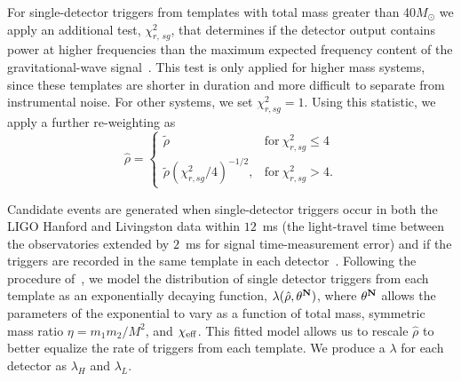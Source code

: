 For single-detector triggers from templates with total mass greater than 40$M_{\odot}$ we apply an additional test, $\chi^2_{r, \,sg}$, that determines if the detector output contains power at higher frequencies than the maximum expected frequency content of the gravitational-wave signal~\citep{Nitz:2017lco}. This test is only applied for higher mass systems, since these templates are shorter in duration and more difficult to separate from instrumental noise. For other systems, we set $\chi^2_{r,sg} = 1$. Using this statistic, we apply a further re-weighting as
%
\begin{equation}
\label{eq:sg}
 \hat{\rho} = \begin{cases} 
        \tilde{\rho} & \mathrm{for}\ \chi^2_{r,sg} \leq 4 \\
        \tilde{\rho} (\chi^2_{r,sg} / 4)^{-1/2}, & 
        \mathrm{for}\ \chi^2_{r,sg} > 4.
    \end{cases}
\end{equation}

Candidate events are generated when single-detector triggers occur in both the LIGO Hanford and Livingston data within $12$~ms (the light-travel time between the observatories extended by $2$~ms for signal time-measurement error) and if the triggers are recorded in the same template in each detector~\citep{Usman:2015kfa}.  Following the procedure of~\cite{Nitz:2017svb}, we model the distribution of single detector triggers from each template as an exponentially decaying function, $\lambda(\hat{\rho}, \bf{\theta}^N)$, where $\bf{\theta}^N$ allows the parameters of the exponential to vary as a function of total mass, symmetric mass ratio $\eta=m_1m_2/M^2$, and $\chi_{\mathrm{eff}}$. This fitted model allows us to rescale $\hat{\rho}$ to better equalize the rate of triggers from each template. We produce a $\lambda$ for each detector as $\lambda_{H}$ and $\lambda_{L}$.

